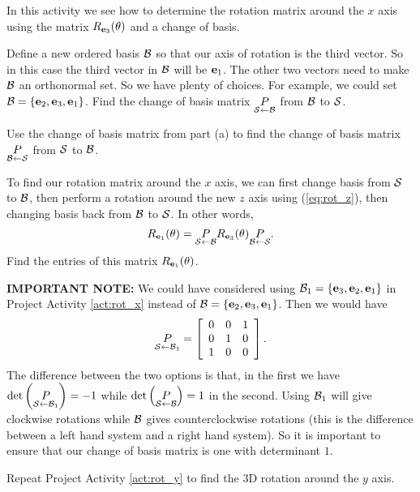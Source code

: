 \begin{pactivity} \label{act:rot_x} In this activity we see how to determine the rotation matrix around the $x$ axis using the matrix $R_{\mathbf{e}_3}(\theta)$ and a change of basis.
\ba
\item  Define a new ordered basis $\mathcal{B}$ so that our axis of rotation is the third vector. So in this case the third vector in $\mathcal{B}$ will be $\mathbf{e}_1$. The other two vectors need to make $\mathcal{B}$ an orthonormal set. So we have plenty of choices. For example, we could set $\mathcal{B} = \{\mathbf{e}_2, \mathbf{e}_3, \mathbf{e}_1\}$. Find the change of basis matrix $\underset{\mathcal{S} \leftarrow \mathcal{B}}{P}$ from $\mathcal{B}$ to $\mathcal{S}$.
	
\item Use the change of basis matrix from part (a) to find the change of basis matrix $\underset{\mathcal{B} \leftarrow \mathcal{S}}{P}$ from $\mathcal{S}$ to $\mathcal{B}$.

\item To find our rotation matrix around the $x$ axis, we can first change basis from $\mathcal{S}$ to $\mathcal{B}$, then perform a rotation around the new $z$ axis using (\ref{eq:rot_z}), then changing basis back from $\mathcal{B}$ to $\mathcal{S}$. In other words, 
\[R_{\mathbf{e}_1}(\theta) = \underset{\mathcal{S} \leftarrow \mathcal{B}}{P} R_{\mathbf{e}_3}(\theta) \underset{\mathcal{B} \leftarrow \mathcal{S}}{P}.\]
Find the entries of this matrix $R_{\mathbf{e}_1}(\theta)$.

\ea

\end{pactivity}


\noindent \textbf{IMPORTANT NOTE:} We could have considered using $\mathcal{B}_1 = \{\mathbf{e}_3, \mathbf{e}_2, \mathbf{e}_1\}$ in Project Activity \ref{act:rot_x} instead of $\mathcal{B} = \{\mathbf{e}_2, \mathbf{e}_3, \mathbf{e}_1\}$. Then we would have 
\[\underset{\mathcal{S} \leftarrow \mathcal{B}_1}{P} = \left[ \begin{array}{ccc} 0&0&1 \\ 0&1&0 \\ 1&0&0 \end{array} \right].\]
The difference between the two options is that, in the first we have $\det\left(\underset{\mathcal{S} \leftarrow \mathcal{B}_1}{P}\right) = -1$ while $\det\left(\underset{\mathcal{S} \leftarrow \mathcal{B}}{P} \right) = 1$ in the second. Using $\mathcal{B}_1$ will give clockwise rotations while $\mathcal{B}$ gives counterclockwise rotations (this is the difference between a left hand system and a right hand system). So it is important to ensure that our change of basis matrix is one with determinant $1$. 

\begin{pactivity} \label{act:rot_y} Repeat Project Activity \ref{act:rot_y} to find the 3D rotation around the $y$ axis. 

\end{pactivity}

